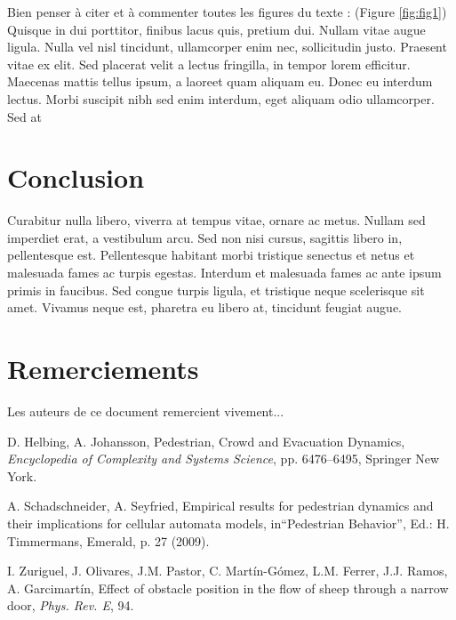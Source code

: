 \documentclass[a4paper]{article}
\begin{document}
{\color{blue}Bien penser à citer et à commenter toutes les figures du texte : (Figure \ref{fig:fig1})}
Quisque in dui porttitor, finibus lacus quis, pretium dui. Nullam vitae augue ligula. Nulla vel nisl tincidunt, ullamcorper enim nec, sollicitudin justo. Praesent vitae ex elit. Sed placerat velit a lectus fringilla, in tempor lorem efficitur. Maecenas mattis tellus ipsum, a laoreet quam aliquam eu. Donec eu interdum lectus. Morbi suscipit nibh sed enim interdum, eget aliquam odio ullamcorper. Sed at 

\section{Conclusion}

Curabitur nulla libero, viverra at tempus vitae, ornare ac metus. Nullam sed imperdiet erat, a vestibulum arcu. Sed non nisi cursus, sagittis libero in, pellentesque est. Pellentesque habitant morbi tristique senectus et netus et malesuada fames ac turpis egestas. Interdum et malesuada fames ac ante ipsum primis in faucibus. Sed congue turpis ligula, et tristique neque scelerisque sit amet. Vivamus neque est, pharetra eu libero at, tincidunt feugiat augue.

\section*{Remerciements}

Les auteurs de ce document remercient vivement... 


\begin{thebibliography}{99}

D. Helbing,  
A. Johansson,  
Pedestrian, Crowd and Evacuation Dynamics, 
\emph{Encyclopedia of Complexity and Systems Science},
pp. 6476--6495, Springer New York.

A. Schadschneider, A. Seyfried, Empirical results for pedestrian dynamics and their implications for cellular automata models,
in``Pedestrian Behavior'', Ed.: H. Timmermans, Emerald, p. 27 (2009).

I. Zuriguel, J.     Olivares, J.M.   Pastor, C.  Mart\'in-G\'omez,  L.M. Ferrer, J.J.  Ramos, A. Garcimart\'in, 
Effect of obstacle position in the flow of sheep through a narrow door, 
\emph{Phys. Rev. E},  94.

\end{thebibliography}
\end{document}

